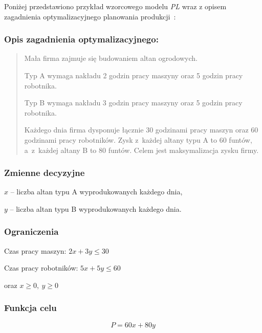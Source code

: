 Poniżej przedstawiono przykład wzorcowego modelu \textit{PL} wraz z opisem zagadnienia optymalizacyjnego planowania produkcji~\cite{cimt}:

\subsubsection*{Opis zagadnienia optymalizacyjnego:} \label{sec:model_example}
\begin{quote}
Mała firma zajmuje się budowaniem altan ogrodowych.

Typ A wymaga nakładu 2 godzin pracy maszyny oraz 5 godzin pracy robotnika.  

Typ B wymaga nakładu 3 godzin pracy maszyny oraz 5 godzin pracy robotnika. 

Każdego dnia firma dysponuje łącznie 30 godzinami pracy maszyn oraz 60 godzinami pracy robotników. Zysk z~każdej altany typu A to 60 funtów, a~z~każdej altany B to 80 funtów. Celem jest maksymalizacja zysku firmy.
\end{quote}

\subsubsection*{Zmienne decyzyjne}

$x$ – liczba altan typu A wyprodukowanych każdego dnia,

$y$ – liczba altan typu B wyprodukowanych każdego dnia.

\subsubsection*{Ograniczenia}

Czas pracy maszyn: $2x + 3y \leq 30$

Czas pracy robotników: $5x + 5y \leq 60$

oraz $x \geq 0, \ y \geq 0$


\subsubsection*{Funkcja celu}
\[
    P = 60x + 80y
\]

